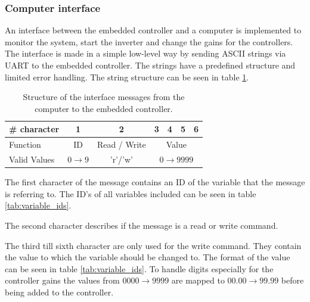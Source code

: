 \subsubsection{Computer interface}
An interface between the embedded controller and a computer is implemented to monitor the system, start the inverter and change the gains for the controllers. The interface is made in a simple low-level way by sending ASCII strings via UART to the embedded controller. The strings have a predefined structure and limited error handling. The string structure can be seen in table \ref{tab:message_structure}. 


\begin{table}[H]
\centering
\begin{tabular}{|l|c|c|c|c|c|c|}
\hline
\# character       & 1       & 2                 & 3            & 4            & 5       & 6   \\ \hline
Function      & ID  & Read / Write                     & \multicolumn{4}{c|}{Value}               \\ \hline
Valid Values & $0\rightarrow 9$ & 'r'/'w'  & \multicolumn{4}{c|}{$0\rightarrow 9999$} \\ \hline
\end{tabular}
\caption{Structure of the interface messages from the computer to the embedded controller.}
\label{tab:message_structure}
\end{table}

The first character of the message contains an ID of the variable that the message is referring to. The ID's of all variables included can be seen in table \ref{tab:variable_ids}.

The second character describes if the message is a read or write command.

The third till sixth character are only used for the write command. They contain the value to which the variable should be changed to. The format of the value can be seen in table \ref{tab:variable_ids}. To handle digits especially for the controller gains the values from $0000 \rightarrow 9999$ are mapped to $00.00 \rightarrow 99.99$ before being added to the controller.


